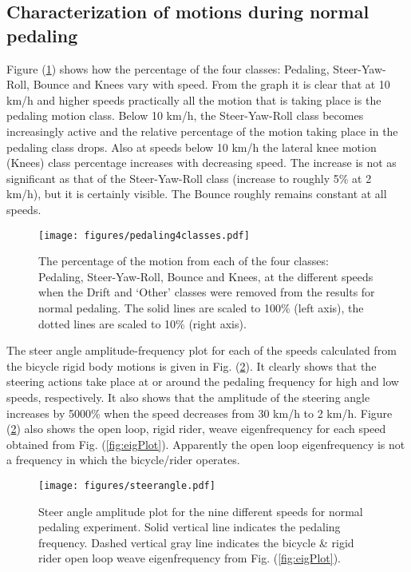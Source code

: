 \subsection{Characterization of motions during normal pedaling}
\label{sec:normalPed}
Figure (\ref{jellybean}) shows how the percentage of the four classes:
Pedaling, Steer-Yaw-Roll, Bounce and Knees vary with speed. From the graph it
is clear that at 10 km/h and higher speeds practically all the motion that is
taking place is the pedaling motion class. Below 10 km/h, the Steer-Yaw-Roll
class becomes increasingly active and the relative percentage of the motion
taking place in the pedaling class drops. Also at speeds below 10 km/h the
lateral knee motion (Knees) class percentage increases with decreasing speed.
The increase is not as significant as that of the Steer-Yaw-Roll class
(increase to roughly 5\% at 2 km/h), but it is certainly visible. The Bounce
roughly remains constant at all speeds.
\begin{figure}[tbp]
    \centering
    \texttt{[image: figures/pedaling4classes.pdf]}
    \caption{The percentage of the motion from each of the four classes:
    Pedaling, Steer-Yaw-Roll, Bounce and Knees, at the different speeds when
    the Drift and `Other' classes were removed from the results for normal
    pedaling. The solid lines are scaled to 100\% (left axis), the dotted lines
    are scaled to 10\% (right axis).}
    \label{jellybean}
\end{figure}
The steer angle amplitude-frequency plot for each of the speeds calculated from
the bicycle rigid body motions is given in Fig. (\ref{pedalsteerangle}). It
clearly shows that the steering actions take place at or around the pedaling
frequency for high and low speeds, respectively. It also shows that the amplitude of the
steering angle increases by 5000\% when the speed decreases from 30 km/h to 2
km/h. Figure (\ref{pedalsteerangle}) also shows the open loop, rigid rider,
weave eigenfrequency for each speed obtained from Fig. (\ref{fig:eigPlot}).
Apparently the open loop eigenfrequency is not a frequency in which the
bicycle/rider operates.
\begin{figure}[tb]
    \centering
        \texttt{[image: figures/steerangle.pdf]}\\
    \caption{Steer angle amplitude plot for the nine different speeds for
    normal pedaling experiment. Solid vertical line indicates the pedaling
    frequency. Dashed vertical gray line indicates the bicycle \& rigid rider
    open loop weave eigenfrequency from Fig. (\ref{fig:eigPlot}).}
    \label{pedalsteerangle}
\end{figure}
